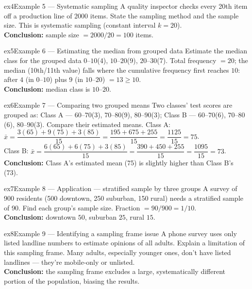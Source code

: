 \documentclass[11pt]{article}
\begin{document}
\begin{example}{ex4}{Example 5 --- Systematic sampling}
A quality inspector checks every 20th item off a production line of 2000 items. State the sampling method and the sample size.\soln
This is systematic sampling (constant interval $k=20$).\\[3pt]\textbf{Conclusion:} sample size $=2000/20=100$ items.
\end{example}

\begin{example}{ex5}{Example 6 --- Estimating the median from grouped data}
Estimate the median class for the grouped data $0$--$10$(4), $10$--$20$(9), $20$--$30$(7).\soln
Total frequency $=20$; the median (10th/11th value) falls where the cumulative frequency first reaches $10$: after $4$ (in $0$--$10$) plus $9$ (in $10$--$20$) $=13\geq10$.\\[3pt]\textbf{Conclusion:} median class is $10$--$20$.
\end{example}

\begin{example}{ex6}{Example 7 --- Comparing two grouped means}
Two classes' test scores are grouped as: Class A --- $60$--$70$(3), $70$--$80$(9), $80$--$90$(3); Class B --- $60$--$70$(6), $70$--$80$(6), $80$--$90$(3). Compare their estimated means.\soln
Class A: $\bar x=\dfrac{3(65)+9(75)+3(85)}{15}=\dfrac{195+675+255}{15}=\dfrac{1125}{15}=75$.\\[3pt]
Class B: $\bar x=\dfrac{6(65)+6(75)+3(85)}{15}=\dfrac{390+450+255}{15}=\dfrac{1095}{15}=73$.\\[3pt]\textbf{Conclusion:} Class A's estimated mean (75) is slightly higher than Class B's (73).
\end{example}

\begin{example}{ex7}{Example 8 --- Application --- stratified sample by three groups}
A survey of 900 residents (500 downtown, 250 suburban, 150 rural) needs a stratified sample of 90. Find each group's sample size.\soln
Fraction $=90/900=1/10$.\\[3pt]\textbf{Conclusion:} downtown $50$, suburban $25$, rural $15$.
\end{example}

\begin{example}{ex8}{Example 9 --- Identifying a sampling frame issue}
A phone survey uses only listed landline numbers to estimate opinions of all adults. Explain a limitation of this sampling frame.\soln
Many adults, especially younger ones, don't have listed landlines --- they're mobile-only or unlisted.\\[3pt]\textbf{Conclusion:} the sampling frame excludes a large, systematically different portion of the population, biasing the results.
\end{example}
\end{document}
